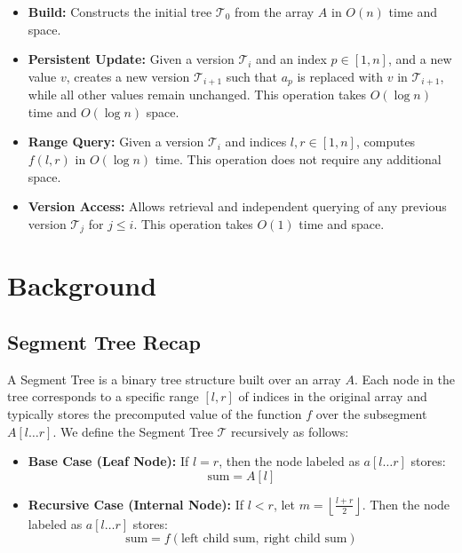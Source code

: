 \documentclass{fairmeta}
\numberwithin{equation}{section}
\begin{document}
\begin{itemize}
    \item \textbf{Build:} Constructs the initial tree $\mathcal{T}_0$ from the array $A$ in $O(n)$ time and space.
    \item \textbf{Persistent Update:} Given a version $\mathcal{T}_i$ and an index $p \in [1, n]$, and a new value $v$, creates a new version $\mathcal{T}_{i+1}$ such that $a_p$ is replaced with $v$ in $\mathcal{T}_{i+1}$, while all other values remain unchanged. This operation takes $O(\log n)$ time and $O(\log n)$ space.
    \item \textbf{Range Query:} Given a version $\mathcal{T}_i$ and indices $l, r \in [1, n]$, computes $f(l, r)$ in $O(\log n)$ time. This operation does not require any additional space.
    \item \textbf{Version Access:} Allows retrieval and independent querying of any previous version $\mathcal{T}_j $ for $j \le i$. This operation takes $O(1)$ time and space.
\end{itemize}

\section{Background}\label{section:background}

\subsection{Segment Tree Recap}

A Segment Tree is a binary tree structure built over an array $A$. Each node in the tree corresponds to a specific range $[l, r]$ of indices in the original array and typically stores the precomputed value of the function $f$ over the subsegment $A[l \ldots r]$. We define the Segment Tree $\mathcal{T}$ recursively as follows:

\begin{itemize}
    \item \textbf{Base Case (Leaf Node):}
          If $l = r$, then the node labeled as $a[l \dots r]$ stores:
          \[
              \text{sum} = A[l]
          \]

    \item \textbf{Recursive Case (Internal Node):}
          If $l < r$, let $m = \left\lfloor \frac{l + r}{2} \right\rfloor$. Then the node labeled as $a[l \dots r]$ stores:
          \[
              \text{sum} = f\left(\text{left child sum},\ \text{right child sum}\right)
          \]
\end{itemize}
\end{document}
